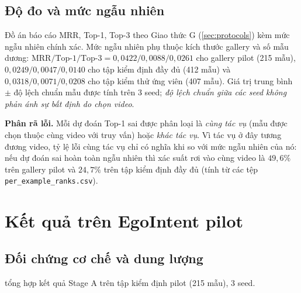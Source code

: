 \documentclass[12pt,a4paper]{report}
\begin{document}
\subsection{Độ đo và mức ngẫu nhiên}
Đồ án báo cáo MRR, Top-1, Top-3 theo Giao thức G (\cref{sec:protocols}) kèm mức ngẫu nhiên chính xác. Mức ngẫu nhiên phụ thuộc kích thước gallery và số mẫu dương: $\mathrm{MRR}/\mathrm{Top}\text{-}1/\mathrm{Top}\text{-}3 = 0{,}0422/0{,}0088/0{,}0261$ cho gallery pilot (215 mẫu), $0{,}0249/0{,}0047/0{,}0140$ cho tập kiểm định đầy đủ (412 mẫu) và $0{,}0318/0{,}0071/0{,}0208$ cho tập kiểm thử ứng viên (407 mẫu). Giá trị trung bình $\pm$ độ lệch chuẩn mẫu được tính trên 3 seed; \emph{độ lệch chuẩn giữa các seed không phản ánh sự bất định do chọn video}.

\textbf{Phân rã lỗi.} Mỗi dự đoán Top-1 sai được phân loại là \emph{cùng tác vụ} (mẫu được chọn thuộc cùng video với truy vấn) hoặc \emph{khác tác vụ}. Vì tác vụ ở đây tương đương video, tỷ lệ lỗi cùng tác vụ chỉ có nghĩa khi so với mức ngẫu nhiên của nó: nếu dự đoán sai hoàn toàn ngẫu nhiên thì xác suất rơi vào cùng video là $49{,}6\%$ trên gallery pilot và $24{,}7\%$ trên tập kiểm định đầy đủ (tính từ các tệp \texttt{per\_example\_ranks.csv}).

\section{Kết quả trên EgoIntent pilot}

\subsection{Đối chứng cơ chế và dung lượng}

 tổng hợp kết quả Stage A trên tập kiểm định pilot (215 mẫu), 3 seed.
\end{document}
